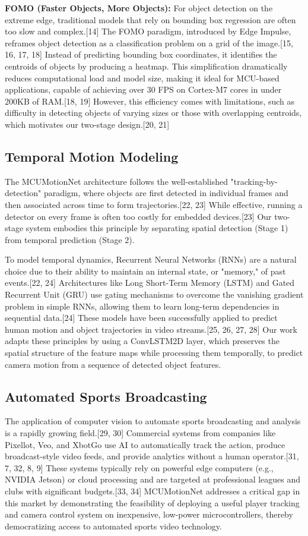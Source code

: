 \documentclass{article}
\begin{document}
\textbf{FOMO (Faster Objects, More Objects):} For object detection on the extreme edge, traditional models that rely on bounding box regression are often too slow and complex.[14] The FOMO paradigm, introduced by Edge Impulse, reframes object detection as a classification problem on a grid of the image.[15, 16, 17, 18] Instead of predicting bounding box coordinates, it identifies the centroids of objects by producing a heatmap. This simplification dramatically reduces computational load and model size, making it ideal for MCU-based applications, capable of achieving over 30 FPS on Cortex-M7 cores in under 200KB of RAM.[18, 19] However, this efficiency comes with limitations, such as difficulty in detecting objects of varying sizes or those with overlapping centroids, which motivates our two-stage design.[20, 21]

\subsection{Temporal Motion Modeling}
The MCUMotionNet architecture follows the well-established "tracking-by-detection" paradigm, where objects are first detected in individual frames and then associated across time to form trajectories.[22, 23] While effective, running a detector on every frame is often too costly for embedded devices.[23] Our two-stage system embodies this principle by separating spatial detection (Stage 1) from temporal prediction (Stage 2).

To model temporal dynamics, Recurrent Neural Networks (RNNs) are a natural choice due to their ability to maintain an internal state, or "memory," of past events.[22, 24] Architectures like Long Short-Term Memory (LSTM) and Gated Recurrent Unit (GRU) use gating mechanisms to overcome the vanishing gradient problem in simple RNNs, allowing them to learn long-term dependencies in sequential data.[24] These models have been successfully applied to predict human motion and object trajectories in video streams.[25, 26, 27, 28] Our work adapts these principles by using a ConvLSTM2D layer, which preserves the spatial structure of the feature maps while processing them temporally, to predict camera motion from a sequence of detected object features.

\subsection{Automated Sports Broadcasting}
The application of computer vision to automate sports broadcasting and analysis is a rapidly growing field.[29, 30] Commercial systems from companies like Pixellot, Veo, and XbotGo use AI to automatically track the action, produce broadcast-style video feeds, and provide analytics without a human operator.[31, 7, 32, 8, 9] These systems typically rely on powerful edge computers (e.g., NVIDIA Jetson) or cloud processing and are targeted at professional leagues and clubs with significant budgets.[33, 34] MCUMotionNet addresses a critical gap in this market by demonstrating the feasibility of deploying a useful player tracking and camera control system on inexpensive, low-power microcontrollers, thereby democratizing access to automated sports video technology.
\end{document}

